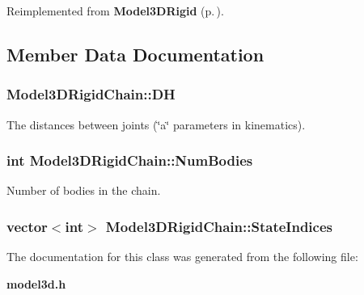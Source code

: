 Reimplemented from {\bf Model3DRigid} {\rm (p.\,\pageref{class_Model3DRigid_a3})}.

\subsection{Member Data Documentation}
\subsubsection{ Model3DRigid\-Chain::DH}\label{class_Model3DRigidChain_m1}


The distances between joints (\char`\"{}a\char`\"{} parameters in kinematics).

\subsubsection{\setlength{\rightskip}{0pt plus 5cm}int Model3DRigid\-Chain::Num\-Bodies}\label{class_Model3DRigidChain_m0}


Number of bodies in the chain.

\subsubsection{\setlength{\rightskip}{0pt plus 5cm}vector$<$int$>$ Model3DRigid\-Chain::State\-Indices}\label{class_Model3DRigidChain_m2}




The documentation for this class was generated from the following file:\begin{CompactItemize}
\item 
{\bf model3d.h}\end{CompactItemize}
